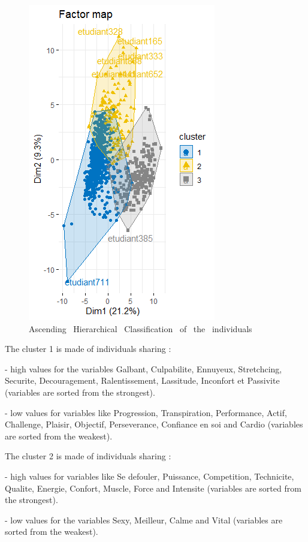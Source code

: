 \documentclass[12pt]{article}
\begin{document}
\begin{figure}[H]
\begin{center}
\includegraphics[scale=0.8]{hcpc.png} 
\caption[]{Ascending \ Hierarchical \ Classification \ of \ the \ individuals }
\end{center}
\end{figure}



The cluster 1 is made of individuals sharing :

- high values for the variables  Galbant, Culpabilite, Ennuyeux, 
Stretchcing, Securite, Decouragement, Ralentissement, Lassitude,
Inconfort et Passivite (variables are sorted from the strongest).

- low values for variables like Progression, Transpiration, Performance,
Actif, Challenge, Plaisir, Objectif, Perseverance, Confiance en soi and Cardio 
(variables are sorted from the weakest).


The cluster 2 is made of individuals sharing :


-	high values for variables like Se defouler, Puissance, Competition, Technicite, Qualite, Energie, Confort, Muscle, Force and Intensite (variables are sorted from the strongest).

-	low values for the variables Sexy, Meilleur, Calme and Vital (variables are sorted from the weakest).
\end{document}
